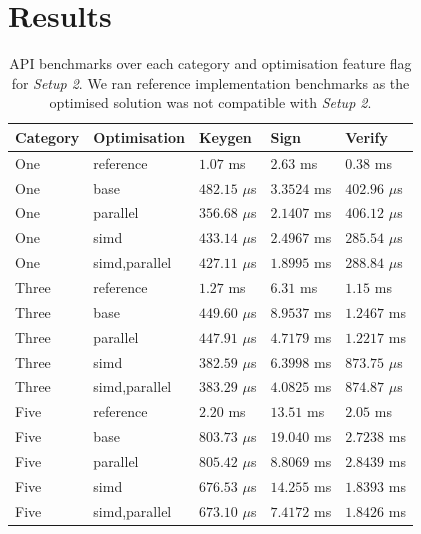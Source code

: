 \documentclass[11pt]{report}
\theoremstyle{definition}
\theoremstyle{plain}
\begin{document}
\section{Results}\label{sub:results}

\begin{table}[H]
  \centering
  \begin{tabular}{l|l|lll}
    \hline
    Category                       & Optimisation  & Keygen          & Sign        & Verify          \\
    \hline
    \hline
    One \cite{aguilar2023return}   & reference     & $1.07$ ms       & $2.63$ ms   & $0.38$ ms       \\
    \arrayrulecolor{lightgray}\hline\arrayrulecolor{black}
    One                            & base          & $482.15$ $\mu$s & $3.3524$ ms & $402.96$ $\mu$s \\
    One                            & parallel      & $356.68$ $\mu$s & $2.1407$ ms & $406.12$ $\mu$s \\
    One                            & simd          & $433.14$ $\mu$s & $2.4967$ ms & $285.54$ $\mu$s \\
    One                            & simd,parallel & $427.11$ $\mu$s & $1.8995$ ms & $288.84$ $\mu$s \\
    \hline
    Three \cite{aguilar2023return} & reference     & $1.27$ ms       & $6.31$ ms   & $1.15$ ms       \\
    \arrayrulecolor{lightgray}\hline\arrayrulecolor{black}
    Three                          & base          & $449.60$ $\mu$s & $8.9537$ ms & $1.2467$ ms     \\
    Three                          & parallel      & $447.91$ $\mu$s & $4.7179$ ms & $1.2217$ ms     \\
    Three                          & simd          & $382.59$ $\mu$s & $6.3998$ ms & $873.75$ $\mu$s \\
    Three                          & simd,parallel & $383.29$ $\mu$s & $4.0825$ ms & $874.87$ $\mu$s \\
    \hline
    Five \cite{aguilar2023return}  & reference     & $2.20$ ms       & $13.51$ ms  & $2.05$ ms       \\
    \arrayrulecolor{lightgray}\hline\arrayrulecolor{black}
    Five                           & base          & $803.73$ $\mu$s & $19.040$ ms & $2.7238$ ms     \\
    Five                           & parallel      & $805.42$ $\mu$s & $8.8069$ ms & $2.8439$ ms     \\
    Five                           & simd          & $676.53$ $\mu$s & $14.255$ ms & $1.8393$ ms     \\
    Five                           & simd,parallel & $673.10$ $\mu$s & $7.4172$ ms & $1.8426$ ms     \\
    \hline
  \end{tabular}
  \caption{API benchmarks over each category and optimisation feature flag for \textit{Setup 2}. We ran reference implementation benchmarks as the optimised solution was not compatible with \textit{Setup 2}.}
  \label{tab:api_mac_results}
\end{table}
\end{document}
